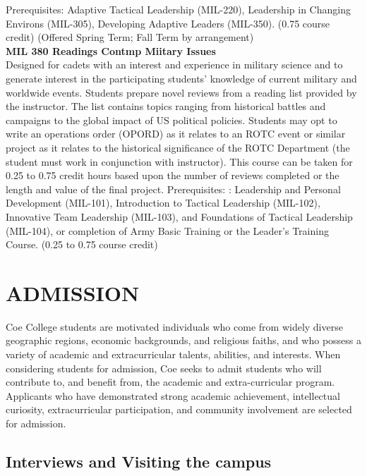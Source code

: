\documentclass[
  letterpaper,
]{scrbook}
\renewcommand{\part}[1]{\addcontentsline{toc}{part}{#1}}
\begin{document}
Prerequisites: Adaptive Tactical Leadership (MIL-220), Leadership in
Changing Environs (MIL-305), Developing Adaptive Leaders (MIL-350).
(0.75 course credit) (Offered Spring Term; Fall Term by arrangement)\\
\textbf{MIL 380 Readings Contmp Miitary Issues}\\
Designed for cadets with an interest and experience in military science
and to generate interest in the participating students' knowledge of
current military and worldwide events. Students prepare novel reviews
from a reading list provided by the instructor. The list contains topics
ranging from historical battles and campaigns to the global impact of US
political policies. Students may opt to write an operations order
(OPORD) as it relates to an ROTC event or similar project as it relates
to the historical significance of the ROTC Department (the student must
work in conjunction with instructor). This course can be taken for 0.25
to 0.75 credit hours based upon the number of reviews completed or the
length and value of the final project. Prerequisites: : Leadership and
Personal Development (MIL-101), Introduction to Tactical Leadership
(MIL-102), Innovative Team Leadership (MIL-103), and Foundations of
Tactical Leadership (MIL-104), or completion of Army Basic Training or
the Leader's Training Course. (0.25 to 0.75 course credit)

\part{ADMISSIONS}

\chapter{ADMISSION}\label{admission}

Coe College students are motivated individuals who come from widely
diverse geographic regions, economic backgrounds, and religious faiths,
and who possess a variety of academic and extracurricular talents,
abilities, and interests. When considering students for admission, Coe
seeks to admit students who will contribute to, and benefit from, the
academic and extra-curricular program. Applicants who have demonstrated
strong academic achievement, intellectual curiosity, extracurricular
participation, and community involvement are selected for admission.

\section{Interviews and Visiting the
campus}\label{interviews-and-visiting-the-campus}
\end{document}
